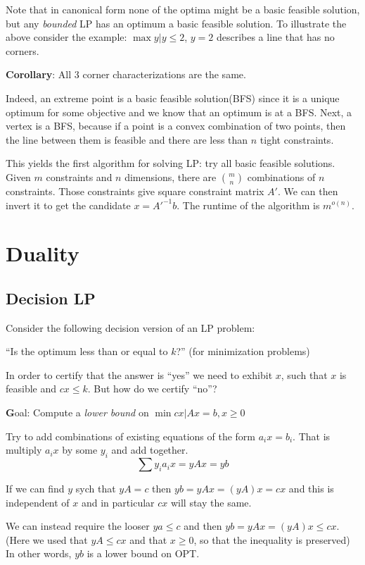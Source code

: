 \documentclass{article}
\begin{document}
Note that in canonical form none of the optima might be a basic feasible solution, but any \emph{bounded} LP has an optimum a basic feasible solution.
To illustrate the above consider the example: $\max y | y \le 2$, $y = 2$ describes a line that has no corners.

\textbf{Corollary}: All 3 corner characterizations are the same.

Indeed, an extreme point is a basic feasible solution(BFS) since it is a unique 
optimum for some objective and we know that an optimum is at a BFS. Next, a vertex is a BFS, because if a point is a convex combination of two points, then the line between them is feasible and there are less than $n$ tight constraints.

This yields the first algorithm for solving LP: try all basic feasible solutions.
Given $m$ constraints and $n$ dimensions, there are $m\choose n$ combinations of $n$ constraints. Those constraints give square constraint matrix $A'$. We can then invert it to get the candidate $x={A'}^{-1}b$.
The runtime of the algorithm is $m^{o(n)}$.

\section{Duality}

\subsection{Decision LP}

Consider the following decision version of an LP problem:

``Is the optimum less than or equal to $k$?'' (for minimization problems)

In order to certify that the answer is ``yes'' we need to exhibit $x$, such that $x$ is feasible and $cx \le k$. But how do we certify ``no''?

{\textbf Goal: } Compute a \emph{lower bound} on $\min cx | Ax=b, x \ge 0$

Try to add combinations of existing equations of the form $a_i x = b_i$. That is multiply $a_ix$ by some $y_i$ and add together.
$$ \sum y_ia_i x = yAx = yb$$

If we can find $y$ sych that $yA = c$ then $yb = yAx = (yA)x = cx$ and this is independent of $x$ and in particular $cx$ will stay the same.

We can instead require the looser $ya \le c$ and then $yb = yAx = (yA)x \le cx$.
(Here we used that $yA \le cx$ and that $x\ge0$, so that the inequality is preserved)
In other words, $yb$ is a lower bound on OPT.
\end{document}

